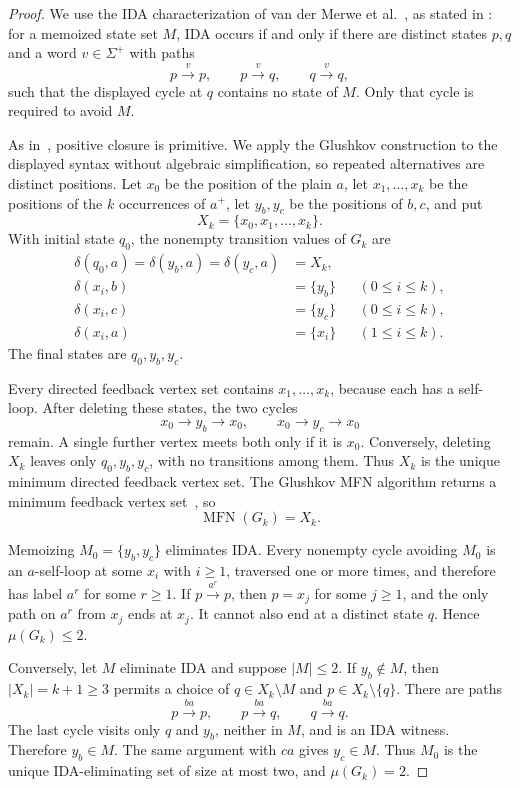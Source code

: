 \documentclass[11pt]{amsart}
\newcommand{\MFN}{\operatorname{MFN}}
\begin{document}
\begin{proof}
We use the IDA characterization of van der Merwe et
al.~\cite{VanderMerwe2021}, as stated in
\cite[Theorem~1]{Berglund2026}: for a memoized state set $M$, IDA
occurs if and only if there are distinct states $p,q$ and a word
$v\in\Sigma^{+}$ with paths
\[
 p\xrightarrow{v}p,
 \qquad p\xrightarrow{v}q,
 \qquad q\xrightarrow{v}q,
\]
such that the displayed cycle at $q$ contains no state of $M$.  Only
that cycle is required to avoid $M$.

As in~\cite{Berglund2026}, positive closure is primitive.  We apply the
Glushkov construction to the displayed syntax without algebraic
simplification, so repeated alternatives are distinct positions.  Let
$x_0$ be the position of the plain $a$, let $x_1,\ldots,x_k$ be the
positions of the $k$ occurrences of $a^{+}$, let $y_b,y_c$ be the
positions of $b,c$, and put
\[
 X_k=\{x_0,x_1,\ldots,x_k\}.
\]
With initial state $q_0$, the nonempty transition values of $G_k$ are
\begin{align*}
 \delta(q_0,a)=\delta(y_b,a)=\delta(y_c,a)&=X_k,\\
 \delta(x_i,b)&=\{y_b\} &&(0\leq i\leq k),\\
 \delta(x_i,c)&=\{y_c\} &&(0\leq i\leq k),\\
 \delta(x_i,a)&=\{x_i\} &&(1\leq i\leq k).
\end{align*}
The final states are $q_0,y_b,y_c$.

Every directed feedback vertex set contains $x_1,\ldots,x_k$, because
each has a self-loop.  After deleting these states, the two cycles
\[
 x_0\longrightarrow y_b\longrightarrow x_0,
 \qquad
 x_0\longrightarrow y_c\longrightarrow x_0
\]
remain.  A single further vertex meets both only if it is $x_0$.
Conversely, deleting $X_k$ leaves only $q_0,y_b,y_c$, with no
transitions among them.  Thus $X_k$ is the unique minimum directed
feedback vertex set.  The Glushkov MFN algorithm returns a minimum
feedback vertex set~\cite[Theorem~4]{Berglund2026}, so
\[
 \MFN(G_k)=X_k.
\]

Memoizing $M_0=\{y_b,y_c\}$ eliminates IDA.  Every nonempty cycle
avoiding $M_0$ is an $a$-self-loop at some $x_i$ with $i\geq1$,
traversed one or more times, and therefore has label $a^r$ for some
$r\geq1$.  If $p\xrightarrow{a^r}p$, then $p=x_j$ for some $j\geq1$,
and the only path on $a^r$ from $x_j$ ends at $x_j$.  It cannot also
end at a distinct state $q$.  Hence $\mu(G_k)\leq2$.

Conversely, let $M$ eliminate IDA and suppose $|M|\leq2$.  If
$y_b\notin M$, then $|X_k|=k+1\geq3$ permits a choice of
$q\in X_k\setminus M$ and $p\in X_k\setminus\{q\}$.  There are paths
\[
 p\xrightarrow{ba}p,
 \qquad p\xrightarrow{ba}q,
 \qquad q\xrightarrow{ba}q.
\]
The last cycle visits only $q$ and $y_b$, neither in $M$, and is an IDA
witness.  Therefore $y_b\in M$.  The same argument with $ca$ gives
$y_c\in M$.  Thus $M_0$ is the unique IDA-eliminating set of size at
most two, and $\mu(G_k)=2$.


\end{proof}
\end{document}
